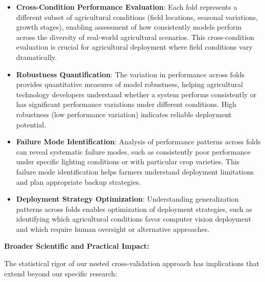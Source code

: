 \begin{itemize}
    \item \textbf{Cross-Condition Performance Evaluation}: Each fold represents a different subset of agricultural conditions (field locations, seasonal variations, growth stages), enabling assessment of how consistently models perform across the diversity of real-world agricultural scenarios. This cross-condition evaluation is crucial for agricultural deployment where field conditions vary dramatically.
    
    \item \textbf{Robustness Quantification}: The variation in performance across folds provides quantitative measures of model robustness, helping agricultural technology developers understand whether a system performs consistently or has significant performance variations under different conditions. High robustness (low performance variation) indicates reliable deployment potential.
    
    \item \textbf{Failure Mode Identification}: Analysis of performance patterns across folds can reveal systematic failure modes, such as consistently poor performance under specific lighting conditions or with particular crop varieties. This failure mode identification helps farmers understand deployment limitations and plan appropriate backup strategies.
    
    \item \textbf{Deployment Strategy Optimization}: Understanding generalization patterns across folds enables optimization of deployment strategies, such as identifying which agricultural conditions favor computer vision deployment and which require human oversight or alternative approaches.
\end{itemize}

\textbf{Broader Scientific and Practical Impact:}

The statistical rigor of our nested cross-validation approach has implications that extend beyond our specific research:

